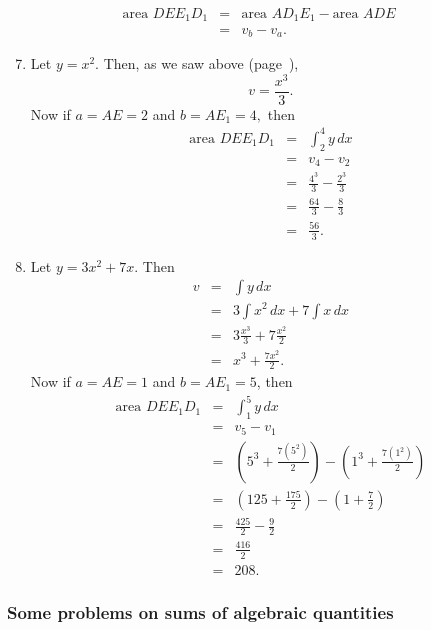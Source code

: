 \documentclass[twoside,openright]{article}
\newlength{\oldjot}
\begin{document}
\begin{eqnarray*}
\mbox{area }DEE_1D_1 & = & \mbox{area }AD_1E_1 - \mbox{area }ADE\\
& = & v_b - v_a.
\end{eqnarray*}
\begin{enumerate}
\setcounter{enumi}{6}

\item Let $y = x^2$. Then, as we saw above (page~\pageref{int1}), 
$$v = \frac{x^3}{3}.$$
Now if $a = AE = 2$ and $b= AE_1 = 4,$ then 
\setlength{\jot}{2ex}
\begin{eqnarray*}
\mbox{area }DEE_1D_1 & = & \int_2^4\! y\,dx\\
& = & v_4 -v_2\\
& = & \frac{4^3}{3} - \frac{2^3}{3}\\
& = & \frac{64}{3} - \frac{8}{3}\\
& = & \frac{56}{3}.
\end{eqnarray*}


\item Let $y = 3x^2 + 7x$.  Then
\begin{eqnarray*}
v & = & \int\!y\,dx\\
& = & 3\int\! x^2\,dx + 7\int\!x\,dx\\
& = & 3\frac{x^3}{3} + 7\frac{x^2}{2}\\
& = & x^3 + \frac{7x^2}{2}.
\end{eqnarray*}
Now if $a = AE = 1$ and $b = AE_1 = 5$, then
\begin{eqnarray*}
\mbox{area }DEE_1D_1 & = & \int_1^5\! y\,dx\\
& = & v_5 -v_1\\
& = & \left(5^3 + \frac{7(5^2)}{2}\right) - \left(1^3 + \frac{7(1^2)}{2}\right)\\
& = & \left(125 + \frac{175}{2}\right) - \left(1 + \frac{7}{2}\right)\\
& = & \frac{425}{2} - \frac{9}{2}\\
& = & \frac{416}{2}\\
& = & 208.
\end{eqnarray*}

\setlength{\jot}{\oldjot}


\end{enumerate}

\subsubsection*{Some problems on sums of algebraic quantities}
\end{document}
